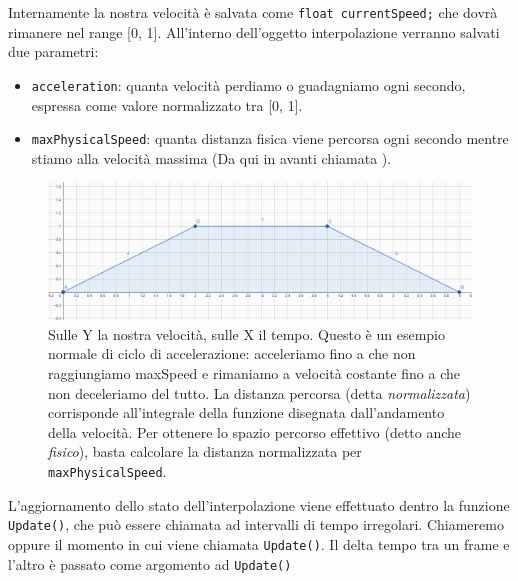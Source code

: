 \documentclass[main.tex]{subfiles}
\begin{document}
Internamente la nostra velocità è salvata come \lstinline{float currentSpeed;} che dovrà rimanere nel range [0, 1]. All'interno dell'oggetto interpolazione verranno salvati due parametri:
\begin{itemize}
    \item \lstinline{acceleration}: quanta velocità perdiamo o guadagniamo ogni secondo, espressa come valore normalizzato tra [0, 1].
    \item \lstinline{maxPhysicalSpeed}: quanta distanza fisica viene percorsa ogni secondo mentre stiamo alla velocità massima (Da qui in avanti chiamata ).
\end{itemize}
\begin{figure}[H]
    \centering
    \includegraphics[width=1\linewidth]{img/interpolazione/normalSpeed.png}
    \caption{Sulle Y la nostra velocità, sulle X il tempo. Questo è un esempio normale di ciclo di accelerazione: acceleriamo fino a che non raggiungiamo maxSpeed e rimaniamo a velocità costante fino a che non deceleriamo del tutto. La distanza percorsa (detta \textit{normalizzata}) corrisponde all'integrale della funzione disegnata dall'andamento della velocità. Per ottenere lo spazio percorso effettivo (detto anche \textit{fisico}), basta calcolare la distanza normalizzata per \lstinline{maxPhysicalSpeed}.}
    \label{fig:4_normalSpeed}
\end{figure}

L'aggiornamento dello stato dell'interpolazione viene effettuato dentro la funzione \lstinline{Update()}, che può essere chiamata ad intervalli di tempo irregolari. Chiameremo  oppure  il momento in cui viene chiamata \lstinline{Update()}. Il delta tempo tra un frame e l'altro è passato come argomento ad \lstinline{Update()}
\end{document}
